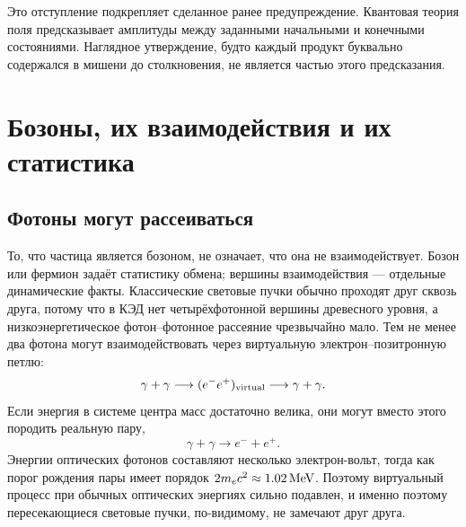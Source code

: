 Это отступление подкрепляет сделанное ранее предупреждение. Квантовая теория поля предсказывает амплитуды между заданными начальными и конечными состояниями. Наглядное утверждение, будто каждый продукт буквально содержался в мишени до столкновения, не является частью этого предсказания.

\section{Бозоны, их взаимодействия и их статистика}

\subsection{Фотоны могут рассеиваться}

То, что частица является бозоном, не означает, что она не взаимодействует. Бозон или фермион задаёт статистику обмена; вершины взаимодействия — отдельные динамические факты. Классические световые пучки обычно проходят друг сквозь друга, потому что в КЭД нет четырёхфотонной вершины древесного уровня, а низкоэнергетическое фотон--фотонное рассеяние чрезвычайно мало. Тем не менее два фотона могут взаимодействовать через виртуальную электрон--позитронную петлю:
\begin{equation}
  \gamma+\gamma
  \longrightarrow(e^-e^+)_{\rm virtual}
  \longrightarrow\gamma+\gamma.
\end{equation}
Если энергия в системе центра масс достаточно велика, они могут вместо этого породить реальную пару,
\begin{equation}
  \gamma+\gamma\longrightarrow e^-+e^+.
\end{equation}
Энергии оптических фотонов составляют несколько электрон-вольт, тогда как порог рождения пары имеет порядок \(2m_e c^2\approx1.02\,{\rm MeV}\). Поэтому виртуальный процесс при обычных оптических энергиях сильно подавлен, и именно поэтому пересекающиеся световые пучки, по-видимому, не замечают друг друга.

\begin{classroomqa}
\end{classroomqa}

